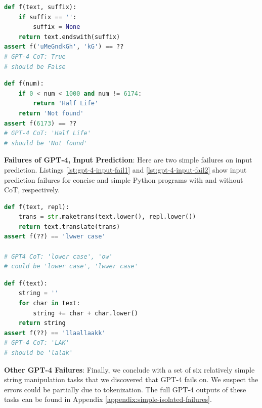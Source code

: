 \begin{minipage}{.48\textwidth}
\begin{lstlisting}[caption=GPT-4 CoT output,label={lst:gpt-4-output-fail1}, breaklines=true, language=python]
def f(text, suffix):
    if suffix == '':
        suffix = None
    return text.endswith(suffix)
assert f('uMeGndkGh', 'kG') == ??
# GPT-4 CoT: True
# should be False
\end{lstlisting}
\end{minipage}\hfill
\begin{minipage}{.48\textwidth}
\begin{lstlisting}[caption=GPT-4 CoT output,label={lst:gpt-4-output-fail2}, breaklines=true, language=python]
def f(num):
    if 0 < num < 1000 and num != 6174:
        return 'Half Life'
    return 'Not found'
assert f(6173) == ??
# GPT-4 CoT: 'Half Life'
# should be 'Not found'
\end{lstlisting}
\end{minipage}

\textbf{Failures of GPT-4, Input Prediction}: Here are two simple failures on input prediction. Listings \ref{lst:gpt-4-input-fail1} and \ref{lst:gpt-4-input-fail2} show input prediction failures for concise and simple Python programs with and without CoT, respectively.

\begin{minipage}{.48\textwidth}
\begin{lstlisting}[caption=GPT-4 CoT input,label={lst:gpt-4-input-fail1}, breaklines=true, language=python]
def f(text, repl):
    trans = str.maketrans(text.lower(), repl.lower())
    return text.translate(trans)
assert f(??) == 'lwwer case'

# GPT4 CoT: 'lower case', 'ow'
# could be 'lower case', 'lwwer case'
\end{lstlisting}
\end{minipage}\hfill
\begin{minipage}{.48\textwidth}
\begin{lstlisting}[caption=GPT-4 CoT input,label={lst:gpt-4-input-fail2}, breaklines=true, language=python]
def f(text):
    string = ''
    for char in text:
        string += char + char.lower()
    return string
assert f(??) == 'llaallaakk'
# GPT-4 CoT: 'LAK'
# should be 'lalak'
\end{lstlisting}
\end{minipage}


\textbf{Other GPT-4 Failures}: Finally, we conclude with a set of six relatively simple string manipulation tasks that we discovered that GPT-4 fails on. We suspect the errors could be partially due to tokenization.
The full GPT-4 outputs of these tasks can be found in Appendix \ref{appendix:simple-isolated-failures}.

